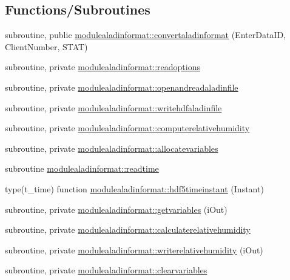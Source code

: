 \subsection*{Functions/\+Subroutines}
\begin{DoxyCompactItemize}
\item 
subroutine, public \mbox{\hyperlink{namespacemodulealadinformat_a77f6d15bb472ac521ff23ef7a54a48e7}{modulealadinformat\+::convertaladinformat}} (Enter\+Data\+ID, Client\+Number, S\+T\+AT)
\item 
subroutine, private \mbox{\hyperlink{namespacemodulealadinformat_aae35e2c47a633497f92dcf61c358e656}{modulealadinformat\+::readoptions}}
\item 
subroutine, private \mbox{\hyperlink{namespacemodulealadinformat_a0340c1a27e19b5142e4089d2951da7cb}{modulealadinformat\+::openandreadaladinfile}}
\item 
subroutine, private \mbox{\hyperlink{namespacemodulealadinformat_ad234b4831ac8d0d1f8ad444d37000469}{modulealadinformat\+::writehdfaladinfile}}
\item 
subroutine, private \mbox{\hyperlink{namespacemodulealadinformat_ae9288daa19c82d5cb2b9c128f3b55cbc}{modulealadinformat\+::computerelativehumidity}}
\item 
subroutine, private \mbox{\hyperlink{namespacemodulealadinformat_a5af9fedde7e74dd064c4bda092bbc671}{modulealadinformat\+::allocatevariables}}
\item 
subroutine \mbox{\hyperlink{namespacemodulealadinformat_a75d489bd9df9a1d8553c1154e13368f1}{modulealadinformat\+::readtime}}
\item 
type(t\+\_\+time) function \mbox{\hyperlink{namespacemodulealadinformat_a5841418d49ae6a17486590f8f686e489}{modulealadinformat\+::hdf5timeinstant}} (Instant)
\item 
subroutine, private \mbox{\hyperlink{namespacemodulealadinformat_ac871ced2e3713912a0c9a9563bbab1cb}{modulealadinformat\+::getvariables}} (i\+Out)
\item 
subroutine, private \mbox{\hyperlink{namespacemodulealadinformat_a1c17164c3687aa7b8257c842cf0ad32a}{modulealadinformat\+::calculaterelativehumidity}}
\item 
subroutine, private \mbox{\hyperlink{namespacemodulealadinformat_a2c5da57a26426886fbd2f4fbe4ce299c}{modulealadinformat\+::writerelativehumidity}} (i\+Out)
\item 
subroutine, private \mbox{\hyperlink{namespacemodulealadinformat_abe2227188275639d4c746fc709d090e2}{modulealadinformat\+::clearvariables}}

\end{DoxyCompactItemize}
